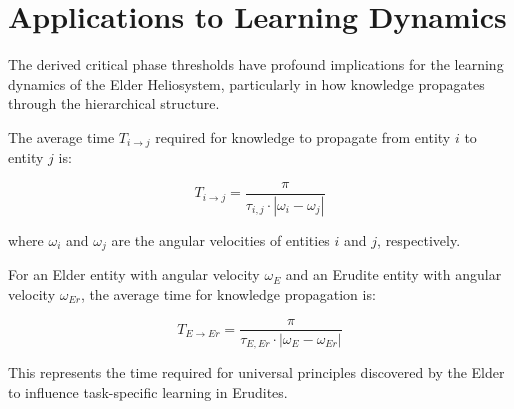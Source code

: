 \section{Applications to Learning Dynamics}

The derived critical phase thresholds have profound implications for the learning dynamics of the Elder Heliosystem, particularly in how knowledge propagates through the hierarchical structure.

\begin{theorem}
The average time $T_{i \to j}$ required for knowledge to propagate from entity $i$ to entity $j$ is:

\begin{equation}
T_{i \to j} = \frac{\pi}{\tau_{i,j} \cdot |\omega_i - \omega_j|}
\end{equation}

where $\omega_i$ and $\omega_j$ are the angular velocities of entities $i$ and $j$, respectively.
\end{theorem}

\begin{corollary}
For an Elder entity with angular velocity $\omega_E$ and an Erudite entity with angular velocity $\omega_{Er}$, the average time for knowledge propagation is:

\begin{equation}
T_{E \to Er} = \frac{\pi}{\tau_{E,Er} \cdot |\omega_E - \omega_{Er}|}
\end{equation}

This represents the time required for universal principles discovered by the Elder to influence task-specific learning in Erudites.
\end{corollary}

